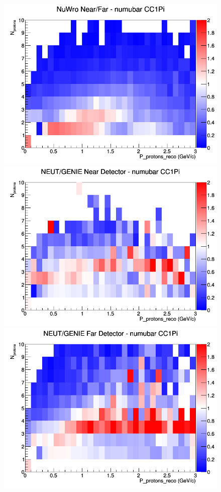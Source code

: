 \begin{figure}[h]
\endminipage
{}
\includegraphics[width=\linewidth]{eff_N_P/FGT/protons/ratios/CC1Pi_NuWro_numubar_NF_N_P.png}
\endminipage
\newline
{}
\includegraphics[width=\linewidth]{eff_N_P/FGT/protons/ratios/CC1Pi_NEUT_GENIE_numubar_near_N_P.png}
\endminipage
{}
\includegraphics[width=\linewidth]{eff_N_P/FGT/protons/ratios/CC1Pi_NEUT_GENIE_numubar_far_N_P.png}

\end{figure}
